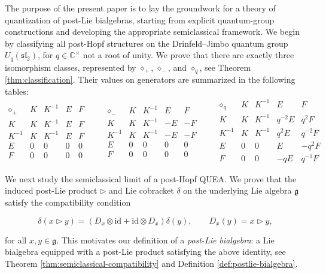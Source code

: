 \documentclass[11pt,english]{article}
\newcommand{\id}{\mathrm{id}}
\newcommand{\act}{\mathbin{\diamond}}
\newcommand{\tri}{\mathbin{\triangleright}}
\theoremstyle{definition}
\begin{document}
The purpose of the present paper is to lay the groundwork
for a theory of quantization of post-Lie bialgebras,
starting from explicit quantum-group constructions and
developing the appropriate semiclassical framework.
We begin by classifying all post-Hopf structures on the
Drinfeld--Jimbo quantum group $U_q(\mathfrak{sl}_2)$,
for $q\in\mathbb C^\times$ not a root of unity.
We prove that there are exactly three isomorphism classes,
represented by $\act_+$, $\act_-$, and $\act_q$, see Theorem \ref{thm:classification}.
Their values on generators are summarized in the
following tables:
\[
\begin{array}{c|cccc}
\act_+ & K & K^{-1} & E & F\\ \hline
K      & K & K^{-1} & E & F\\
K^{-1} & K & K^{-1} & E & F\\
E      & 0 & 0 & 0 & 0\\
F      & 0 & 0 & 0 & 0
\end{array}
\qquad
\begin{array}{c|cccc}
\act_- & K & K^{-1} & E & F\\ \hline
K      & K & K^{-1} & -E & -F\\
K^{-1} & K & K^{-1} & -E & -F\\
E      & 0 & 0 & 0 & 0\\
F      & 0 & 0 & 0 & 0
\end{array}
\qquad
\begin{array}{c|cccc}
\act_q & K & K^{-1} & E & F\\ \hline
K      & K & K^{-1} & q^{-2}E & q^2F\\
K^{-1} & K & K^{-1} & q^2E & q^{-2}F\\
E      & 0 & 0 & E & -q^2F\\
F      & 0 & 0 & -qE & q^{-1}F
\end{array}
\]

We next study the semiclassical limit of a post-Hopf QUEA. We prove that the induced post-Lie product $\tri$ and Lie cobracket $\delta$ on the underlying Lie algebra $\mathfrak g$ satisfy the compatibility condition

\[
\delta(x\tri y)
=
(D_x\otimes\id+\id\otimes D_x)\delta(y),
\qquad D_x(y)=x\tri y,
\]

for all $x,y\in\mathfrak g$. This motivates our definition of a \emph{post-Lie bialgebra}: a Lie bialgebra equipped with a post-Lie product satisfying the above identity, see Theorem \ref{thm:semiclassical-compatibility} and Definition \ref{def:postlie-bialgebra}. 
\end{document}
